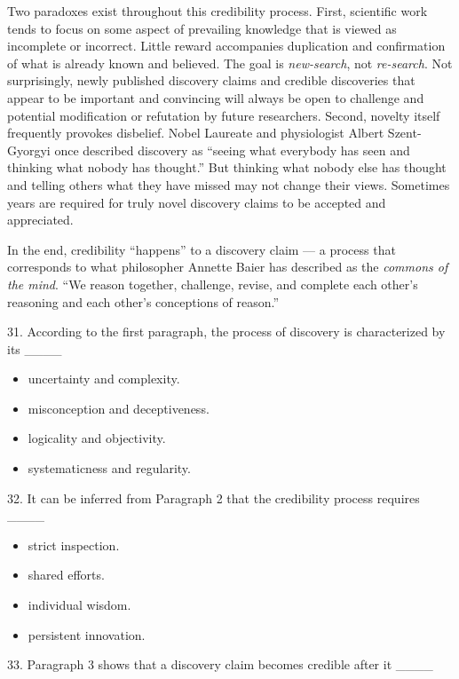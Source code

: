 \documentclass[UTF8,11pt]{ctexart}
\begin{document}
Two paradoxes exist throughout this credibility process. First, scientific work tends to focus on some aspect of prevailing knowledge that is viewed as incomplete or incorrect. Little reward accompanies duplication and confirmation of what is already known and believed. The goal is \textit{new-search}, not \textit{re-search}. Not surprisingly, newly published discovery claims and credible discoveries that appear to be important and convincing will always be open to challenge and potential modification or refutation by future researchers. Second, novelty itself frequently provokes disbelief. Nobel Laureate and physiologist Albert Szent-Gyorgyi once described discovery as “seeing what everybody has seen and thinking what nobody has thought.” But thinking what nobody else has thought and telling others what they have missed may not change their views. Sometimes years are required for truly novel discovery claims to be accepted and appreciated.


In the end, credibility “happens” to a discovery claim — a process that corresponds to what philosopher Annette Baier has described as the \textit{commons of the mind}. “We reason together, challenge, revise, and complete each other’s reasoning and each other’s conceptions of reason.”


31. According to the first paragraph, the process of discovery is characterized by its \_\_\_\_


\begin{itemize}[leftmargin=2em,itemsep=.2em,topsep=.4em]\item[A.] uncertainty and complexity.
\item[B.] misconception and deceptiveness.
\item[C.] logicality and objectivity.
\item[D.] systematicness and regularity.
\end{itemize}

32. It can be inferred from Paragraph 2 that the credibility process requires \_\_\_\_


\begin{itemize}[leftmargin=2em,itemsep=.2em,topsep=.4em]\item[A.] strict inspection.
\item[B.] shared efforts.
\item[C.] individual wisdom.
\item[D.] persistent innovation.
\end{itemize}

33. Paragraph 3 shows that a discovery claim becomes credible after it \_\_\_\_
\end{document}
